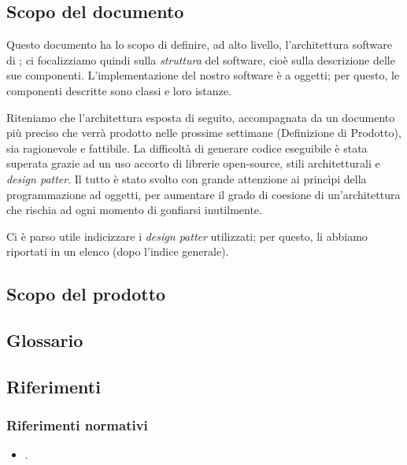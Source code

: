 
\subsection{Scopo del documento}
Questo documento ha lo scopo di definire, ad alto livello, l'architettura software di \proj; ci focalizziamo quindi sulla \emph{struttura} del software, cioè sulla descrizione delle sue componenti. L'implementazione del nostro software è a oggetti; per questo, le componenti descritte sono classi e loro istanze.

Riteniamo che l'architettura esposta di seguito, accompagnata da un documento più preciso che verrà prodotto nelle prossime settimane (Definizione di Prodotto), sia ragionevole e fattibile. La difficoltà di generare codice eseguibile è stata superata grazie ad un uso accorto di librerie open-source, stili architetturali e \emph{design patter}. Il tutto è stato svolto con grande attenzione ai princìpi della programmazione ad oggetti, per aumentare il grado di coesione di un'architettura che rischia ad ogni momento di gonfiarsi inutilmente.

Ci è parso utile indicizzare i \emph{design patter} utilizzati; per questo, li abbiamo riportati in un elenco (dopo l'indice generale).

\subsection{Scopo del prodotto}
\scopo

\subsection{Glossario}
\presgloss

\subsection{Riferimenti} \label{sec:ref}

\subsubsection{Riferimenti normativi}
\begin{itemize}
	\item \NdP.
\end{itemize}

